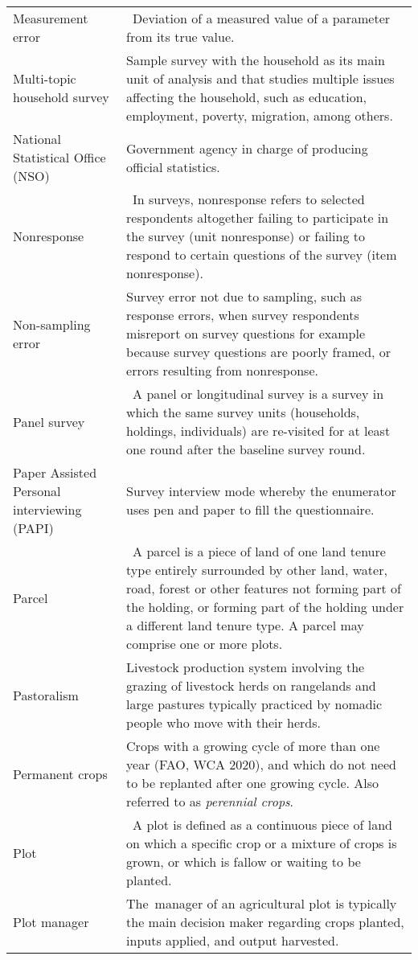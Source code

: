 \documentclass[
]{book}
\begin{document}
\begin{longtable}[]{@{}ll@{}}
Measurement error & ~Deviation of a measured value of a parameter from its true value. \\
Multi-topic household survey & Sample survey with the household as its main unit of analysis and that studies multiple issues affecting the household, such as education, employment, poverty, migration, among others. \\
National Statistical Office (NSO) & Government agency in charge of producing official statistics. \\
Nonresponse & ~In surveys, nonresponse refers to selected respondents altogether failing to participate in the survey (unit nonresponse) or failing to respond to certain questions of the survey (item nonresponse). \\
Non-sampling error & Survey error not due to sampling, such as response errors, when survey respondents misreport on survey questions for example because survey questions are poorly framed, or errors resulting from nonresponse. \\
Panel survey & ~A panel or longitudinal survey is a survey in which the same survey units (households, holdings, individuals) are re-visited for at least one round after the baseline survey round. \\
Paper Assisted Personal interviewing (PAPI) & Survey interview mode whereby the enumerator uses pen and paper to fill the questionnaire. \\
Parcel & ~A parcel is a piece of land of one land tenure type entirely surrounded by other land, water, road, forest or other features not forming part of the holding, or forming part of the holding under a different land tenure type. A parcel may comprise one or more plots. \\
Pastoralism & Livestock production system involving the grazing of livestock herds on rangelands and large pastures typically practiced by nomadic people who move with their herds. \\
Permanent crops & Crops with a growing cycle of more than one year (FAO, WCA 2020), and which do not need to be replanted after one growing cycle. Also referred to as \emph{perennial crops}. \\
Plot & ~A plot is defined as a continuous piece of land on which a specific crop or a mixture of crops is grown, or which is fallow or waiting to be planted. \\
Plot manager & The~manager of an agricultural plot is typically the main decision maker regarding crops planted, inputs applied, and output harvested. \\

\end{longtable}
\end{document}
